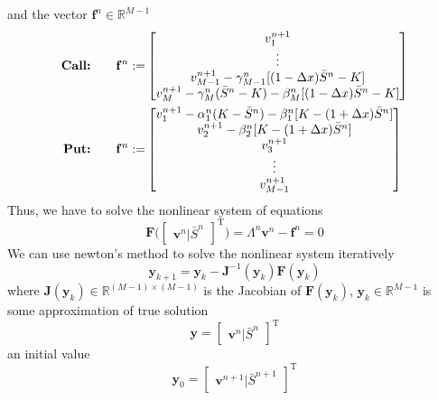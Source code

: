 and the vector $\mathbf{f}^{n} \in \mathbb{R}^{M-1}$
\begin{subequations}
  \begin{align}
    \text{\textbf{Call:}} \qquad \mathbf{f}^n :=& \begin{bmatrix}
      v^{n+1}_{1} \\
      \vdots \\
      v^{n+1}_{M-1} - \gamma^{n}_{M-1}[(1-\Delta{x})\bar{S}^{n} - K] \\
      v^{n+1}_{M} - \gamma^{n}_{M}(\bar{S}^n - K) - \beta^{n}_{M}[(1-\Delta{x})\bar{S}^{n} - K]
    \end{bmatrix}\\
    \text{\textbf{Put:}} \qquad \mathbf{f}^n :=& \begin{bmatrix}
      v^{n+1}_{1} - \alpha^{n}_{1}(K - \bar{S}^{n}) - \beta^{n}_{1}[K - (1+\Delta{x})\bar{S}^{n}] \\
      v^{n+1}_{2} - \beta^{n}_2[K - (1+\Delta{x})\bar{S}^{n}] \\
      v^{n+1}_{3} \\
      \vdots \\
      v^{n+1}_{M-1}
    \end{bmatrix}
  \end{align}
\end{subequations}
Thus, we have to solve the nonlinear system of equations
\begin{equation}
  \mathbf{F}\big(\begin{bmatrix}
    \mathbf{v}^{n} | \bar{S}^{n}
  \end{bmatrix}^{\text{T}}\big) = \Lambda^{n}\mathbf{v}^{n} - \mathbf{f}^n = 0
\end{equation}
We can use newton's method to solve the nonlinear system iteratively
\begin{equation}
  \mathbf{y}_{k+1} = \mathbf{y}_{k} - \mathbf{J}^{-1}(\mathbf{y}_{k})\mathbf{F}(\mathbf{y}_{k})
\end{equation}
where $\mathbf{J}(\mathbf{y}_k)\in\mathbb{R}^{(M-1)\times(M-1)}$ is the Jacobian of $\mathbf{F}(\mathbf{y}_k)$, $\mathbf{y}_k\in\mathbb{R}^{M-1}$ is some approximation of true solution
\begin{equation}
  \mathbf{y} = \begin{bmatrix}
    \mathbf{v}^{n} | \bar{S}^{n}
  \end{bmatrix}^{\text{T}}
\end{equation}
an initial value 
\begin{equation}
  \mathbf{y}_{0} = \begin{bmatrix}
    \mathbf{v}^{n+1} | \bar{S}^{n+1}
  \end{bmatrix}^{\text{T}}
\end{equation}

